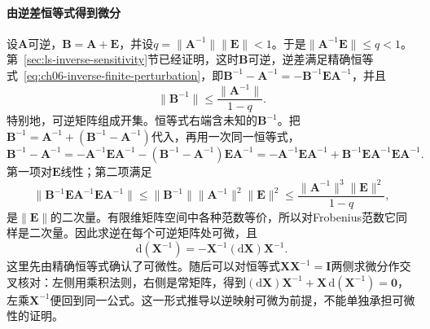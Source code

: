 \paragraph{由逆差恒等式得到微分}
设$\bm A$可逆，$\bm B=\bm A+\bm E$，并设$q=\lVert\bm A^{-1}\rVert\lVert\bm E\rVert<1$。于是$\lVert\bm A^{-1}\bm E\rVert\leq q<1$。第~\ref{sec:ls-inverse-sensitivity}节已经证明，这时$\bm B$可逆，逆差满足精确恒等式~\eqref{eq:ch06-inverse-finite-perturbation}，即$\bm B^{-1}-\bm A^{-1}=-\bm B^{-1}\bm E\bm A^{-1}$，并且
\[
 \lVert\bm B^{-1}\rVert\leq\frac{\lVert\bm A^{-1}\rVert}{1-q}.
\]
特别地，可逆矩阵组成开集。恒等式右端含未知的$\bm B^{-1}$。把$\bm B^{-1}=\bm A^{-1}+(\bm B^{-1}-\bm A^{-1})$代入，再用一次同一恒等式，
\[
 \bm B^{-1}-\bm A^{-1}
 =-\bm A^{-1}\bm E\bm A^{-1}-(\bm B^{-1}-\bm A^{-1})\bm E\bm A^{-1}
 =-\bm A^{-1}\bm E\bm A^{-1}+\bm B^{-1}\bm E\bm A^{-1}\bm E\bm A^{-1}.
\]
第一项对$\bm E$线性；第二项满足
\begin{equation}
 \lVert\bm B^{-1}\bm E\bm A^{-1}\bm E\bm A^{-1}\rVert
 \leq\lVert\bm B^{-1}\rVert\lVert\bm A^{-1}\rVert^2\lVert\bm E\rVert^2
 \leq\frac{\lVert\bm A^{-1}\rVert^3\lVert\bm E\rVert^2}{1-q},
\label{eq:multivariable-inverse-remainder-bound}
\end{equation}
是$\lVert\bm E\rVert$的二次量。有限维矩阵空间中各种范数等价，所以对Frobenius范数它同样是二次量。因此求逆在每个可逆矩阵处可微，且
\begin{equation}
  \mathrm{d}(\bm{X}^{-1})
  =
  -\bm{X}^{-1}(\mathrm{d}\bm{X})\bm{X}^{-1}.
\label{eq:analysis-inverse-differential}
\end{equation}
这里先由精确恒等式确认了可微性。随后可以对恒等式$\bm{X}\bm{X}^{-1}=\bm{I}$两侧求微分作交叉核对：左侧用乘积法则，右侧是常矩阵，得到$(\mathrm{d}\bm{X})\bm{X}^{-1}+\bm{X}\,\mathrm{d}(\bm{X}^{-1})=\bm{0}$，左乘$\bm{X}^{-1}$便回到同一公式。这一形式推导以逆映射可微为前提，不能单独承担可微性的证明。

